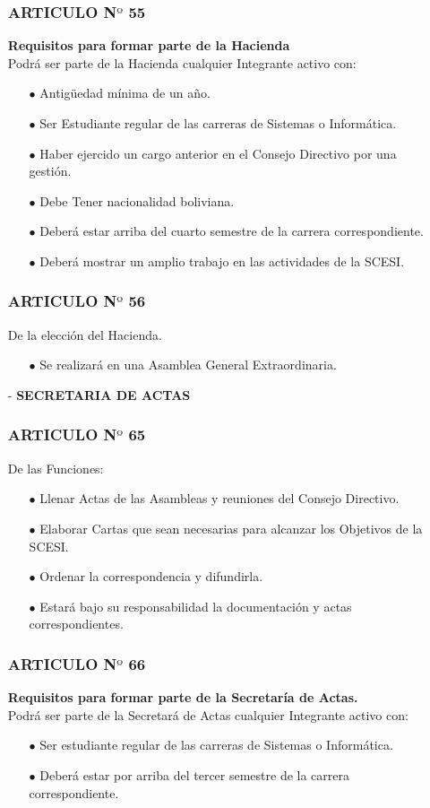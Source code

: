 \documentclass[11pt,letterpaper]{book}
\begin{document}
\begin{itemize}
\subsubsection*{ARTICULO N$º$ 55}
{\bf Requisitos para formar parte de la Hacienda}\\
Podrá ser parte de la Hacienda cualquier Integrante activo con:
\begin{itemize}
\item[$\bullet$] Antigüedad mínima de un año.
\item[$\bullet$] Ser Estudiante regular de las carreras de Sistemas o Informática.  
\item[$\bullet$] Haber ejercido un cargo anterior en el Consejo Directivo por una gestión. 
\item[$\bullet$] Debe Tener nacionalidad boliviana. 
\item[$\bullet$] Deberá estar arriba del cuarto semestre de la carrera  correspondiente. 
\item[$\bullet$] Deberá mostrar un amplio trabajo en las actividades de la SCESI. 
\end{itemize}
\subsubsection*{ARTICULO N$º$ 56}
De la elección del Hacienda.
\begin{itemize}
\item[$\bullet$] Se realizará en una Asamblea General Extraordinaria.
\end{itemize}
\item[-] {\bf SECRETARIA DE ACTAS}
\subsubsection*{ARTICULO N$º$ 65}
De las Funciones:
\begin{itemize}
\item[$\bullet$] Llenar Actas de las Asambleas y reuniones del Consejo Directivo. 
\item[$\bullet$] Elaborar Cartas que sean necesarias para alcanzar los Objetivos de la SCESI. 
\item[$\bullet$] Ordenar la correspondencia y difundirla. 
\item[$\bullet$] Estará bajo su responsabilidad la documentación y actas correspondientes. 
\end{itemize}
\subsubsection*{ARTICULO N$º$ 66}
{\bf Requisitos para formar parte de la Secretaría de Actas.}\\
Podrá ser parte de la Secretará de Actas cualquier Integrante activo con:
\begin{itemize}
\item[$\bullet$] Ser estudiante regular de las carreras de Sistemas o Informática. 
\item[$\bullet$] Deberá estar por arriba del tercer semestre de la carrera correspondiente. 
\end{itemize}

\end{itemize}
\end{document}
